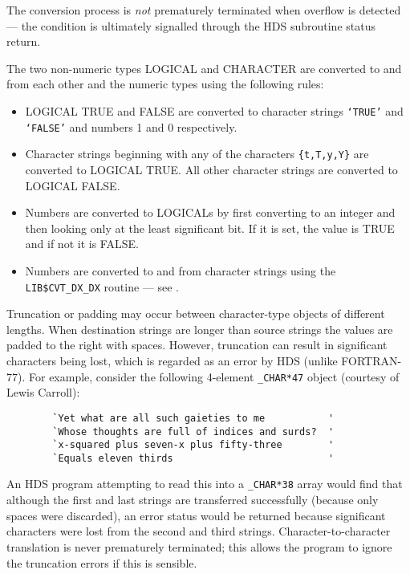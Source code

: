 The conversion process is {\em not} prematurely terminated when overflow is
detected --- the condition is ultimately signalled through the HDS subroutine
status return. 

The two non-numeric types LOGICAL and CHARACTER are converted to and from each
other and the numeric types using the following rules: 

\begin {itemize}
\item LOGICAL TRUE and FALSE are converted to character strings
{\tt `TRUE'} and {\tt `FALSE'} and numbers 1 and 0 respectively. 
\item Character strings beginning with any of the characters {\tt \{t,T,y,Y\}}
are converted to LOGICAL TRUE. All other character strings are converted to
LOGICAL FALSE. 
\item Numbers are converted to LOGICALs by first converting to an integer
and then looking only at the least significant bit. If it is set, the value
is TRUE and if not it is FALSE.
\item Numbers are converted to and from character strings using the {\tt
LIB\$CVT\_DX\_DX} routine --- see \cite{run_time_library_reference}.
\end {itemize}

Truncation or padding may occur between character-type objects of different
lengths. When destination strings are longer than source strings the values
are padded to the right with spaces. However, truncation can result in
significant characters being lost, which is regarded as an error by HDS (unlike
FORTRAN-77). For example, consider the following 4-element {\tt \_CHAR*47}
object (courtesy of Lewis Carroll):

\begin {verbatim}
        `Yet what are all such gaieties to me           '
        `Whose thoughts are full of indices and surds?  '
        `x-squared plus seven-x plus fifty-three        '
        `Equals eleven thirds                           '
\end{verbatim}

An HDS program attempting to read this into a {\tt \_CHAR*38} array would find
that although the first and last strings are transferred successfully (because
only spaces were discarded), an error status would be returned because
significant characters were lost from the second and third strings.
Character-to-character translation is never prematurely terminated; this allows
the program to ignore the truncation errors if this is sensible.


